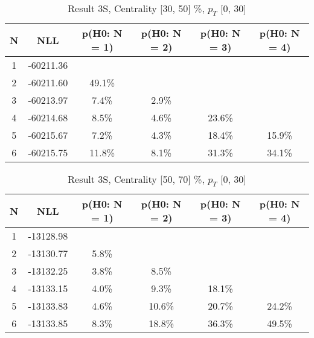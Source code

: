 \begin{table}[htb]
	\begin{center}
	\caption{Result 3S, Centrality [30, 50] \%, $p_{T}$ [0, 30] \GeV
}
{\footnotesize\renewcommand{\arraystretch}{1.4}
		\begin{tabular}{cc||>{\columncolor[gray]{0.8}}cccc}
			N & NLL & p(H0: N = 1) & p(H0: N = 2) & p(H0: N = 3) & p(H0: N = 4)\\ 
		\hline
1 & -60211.36 & & & & \\
2 & -60211.60 & 49.1\% & & & \\
3 & -60213.97 & 7.4\% & 2.9\% & & \\
4 & -60214.68 & 8.5\% & 4.6\% & 23.6\% & \\
5 & -60215.67 & 7.2\% & 4.3\% & 18.4\% & 15.9\% \\
6 & -60215.75 & 11.8\% & 8.1\% & 31.3\% & 34.1\% \\
	\end{tabular}
		\label{tab:lab}
	}
	\end{center}\end{table}

\begin{table}[htb]
	\begin{center}
	\caption{Result 3S, Centrality [50, 70] \%, $p_{T}$ [0, 30] \GeV
}
{\footnotesize\renewcommand{\arraystretch}{1.4}
		\begin{tabular}{cc||c>{\columncolor[gray]{0.8}}ccc}
			N & NLL & p(H0: N = 1) & p(H0: N = 2) & p(H0: N = 3) & p(H0: N = 4)\\ 
		\hline
1 & -13128.98 & & & & \\
2 & -13130.77 & 5.8\% & & & \\
3 & -13132.25 & 3.8\% & 8.5\% & & \\
4 & -13133.15 & 4.0\% & 9.3\% & 18.1\% & \\
5 & -13133.83 & 4.6\% & 10.6\% & 20.7\% & 24.2\% \\
6 & -13133.85 & 8.3\% & 18.8\% & 36.3\% & 49.5\% \\
	\end{tabular}
		\label{tab:lab}
	}
	\end{center}\end{table}

